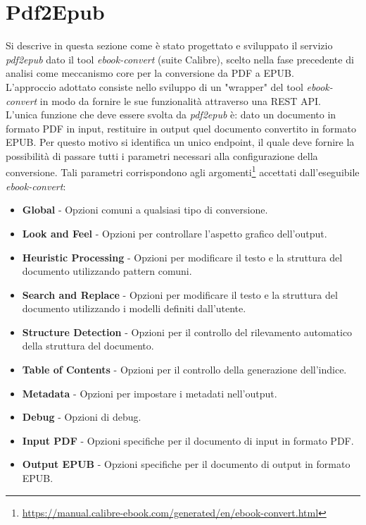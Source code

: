 
\section{Pdf2Epub}
Si descrive in questa sezione come è stato progettato e sviluppato il servizio \textit{pdf2epub} dato il tool \textit{ebook-convert} (suite Calibre), scelto nella fase precedente di analisi come meccanismo core per la conversione da PDF a EPUB.\\
L'approccio adottato consiste nello sviluppo di un "wrapper" del tool \textit{ebook-convert} in modo da fornire le sue funzionalità attraverso una REST API.\\
L'unica funzione che deve essere svolta da \textit{pdf2epub} è: dato un documento in formato PDF in input, restituire in output quel documento convertito in formato EPUB. Per questo motivo si identifica un unico endpoint, il quale deve fornire la possibilità di passare tutti i parametri necessari alla configurazione della conversione. Tali parametri corrispondono agli argomenti\footnote{\url{https://manual.calibre-ebook.com/generated/en/ebook-convert.html}} accettati dall'eseguibile \textit{ebook-convert}:
\begin{itemize}
    \item \textbf{Global} - Opzioni comuni a qualsiasi tipo di conversione.
    \item \textbf{Look and Feel} - Opzioni per controllare l'aspetto grafico dell'output.
    \item \textbf{Heuristic Processing} - Opzioni per modificare il testo e la struttura del documento utilizzando pattern comuni.
    \item \textbf{Search and Replace} - Opzioni per modificare il testo e la struttura del documento utilizzando i modelli definiti dall'utente.
    \item \textbf{Structure Detection} - Opzioni per il controllo del rilevamento automatico della struttura del documento.
    \item \textbf{Table of Contents} - Opzioni per il controllo della generazione dell'indice.
    \item \textbf{Metadata} - Opzioni per impostare i metadati nell'output.
    \item \textbf{Debug} - Opzioni di debug.
    \item \textbf{Input PDF} - Opzioni specifiche per il documento di input in formato PDF.
    \item \textbf{Output EPUB} - Opzioni specifiche per il documento di output in formato EPUB.
\end{itemize}
